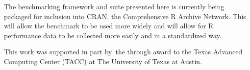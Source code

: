 The benchmarking framework and suite presented here is currently being packaged for inclusion into CRAN, the Comprehensive R Archive Network. This will allow the benchmark to be used more widely and will allow for R performance data to be collected more easily and in a standardized way.

\begin{acks}
This work was supported in part by the  through award  to the Texas Advanced Computing Center (TACC) at The University of Texas at Austin.
\end{acks}



